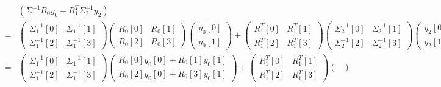 \documentclass[a4paper,landscape]{article}
\begin{document}
        \begin{eqnarray*}
            &&\left( \Sigma_1^{-1} R_0 y_0 + R_1^T \Sigma_2^{-1} y_2 \right)\\
            &=&
            \begin{pmatrix}
                \Sigma_1^{-1}[0] & \Sigma_1^{-1}[1]\\
                \Sigma_1^{-1}[2] & \Sigma_1^{-1}[3]
            \end{pmatrix}
            \begin{pmatrix}
                R_0[0] & R_0[1]\\
                R_0[2] & R_0[3]
            \end{pmatrix}
            \begin{pmatrix}
                y_0[0]\\
                y_0[1]
            \end{pmatrix}
            +
            \begin{pmatrix}
                R_1^T[0] & R_1^T[1]\\
                R_1^T[2] & R_1^T[3]
            \end{pmatrix}
            \begin{pmatrix}
                \Sigma_2^{-1}[0] & \Sigma_2^{-1}[1]\\
                \Sigma_2^{-1}[2] & \Sigma_2^{-1}[3]
            \end{pmatrix}
            \begin{pmatrix}
                y_2[0]\\
                y_2[1]
            \end{pmatrix}\\
            &=&
            \begin{pmatrix}
                \Sigma_1^{-1}[0] & \Sigma_1^{-1}[1]\\
                \Sigma_1^{-1}[2] & \Sigma_1^{-1}[3]
            \end{pmatrix}
            \begin{pmatrix}
                R_0[0]y_0[0] + R_0[1]y_0[1]\\
                R_0[2]y_0[0] + R_0[3]y_0[1]
            \end{pmatrix}
            +
            \begin{pmatrix}
                R_1^T[0] & R_1^T[1]\\
                R_1^T[2] & R_1^T[3]
            \end{pmatrix}
            \begin{pmatrix}

\end{pmatrix}
\end{eqnarray*}
\end{document}
